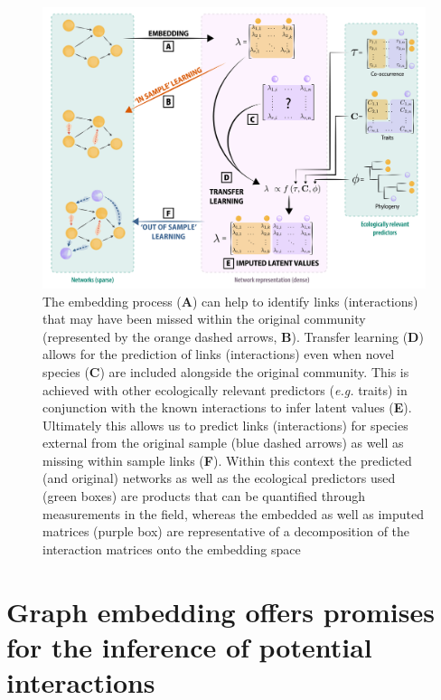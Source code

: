 \documentclass[
  letterpaper,
  DIV=11,
  numbers=noendperiod]{scrartcl}
\begin{document}
\begin{figure}

{\centering \includegraphics{figures/conceptual_2.png}

}

\caption{\label{fig-embedding}The embedding process (\textbf{A}) can
help to identify links (interactions) that may have been missed within
the original community (represented by the orange dashed arrows,
\textbf{B}). Transfer learning (\textbf{D}) allows for the prediction of
links (interactions) even when novel species (\textbf{C}) are included
alongside the original community. This is achieved with other
ecologically relevant predictors (\emph{e.g.} traits) in conjunction
with the known interactions to infer latent values (\textbf{E}).
Ultimately this allows us to predict links (interactions) for species
external from the original sample (blue dashed arrows) as well as
missing within sample links (\textbf{F}). Within this context the
predicted (and original) networks as well as the ecological predictors
used (green boxes) are products that can be quantified through
measurements in the field, whereas the embedded as well as imputed
matrices (purple box) are representative of a decomposition of the
interaction matrices onto the embedding space}

\end{figure}

\hypertarget{graph-embedding-offers-promises-for-the-inference-of-potential-interactions}{%
\section{Graph embedding offers promises for the inference of potential
interactions}\label{graph-embedding-offers-promises-for-the-inference-of-potential-interactions}}
\end{document}
